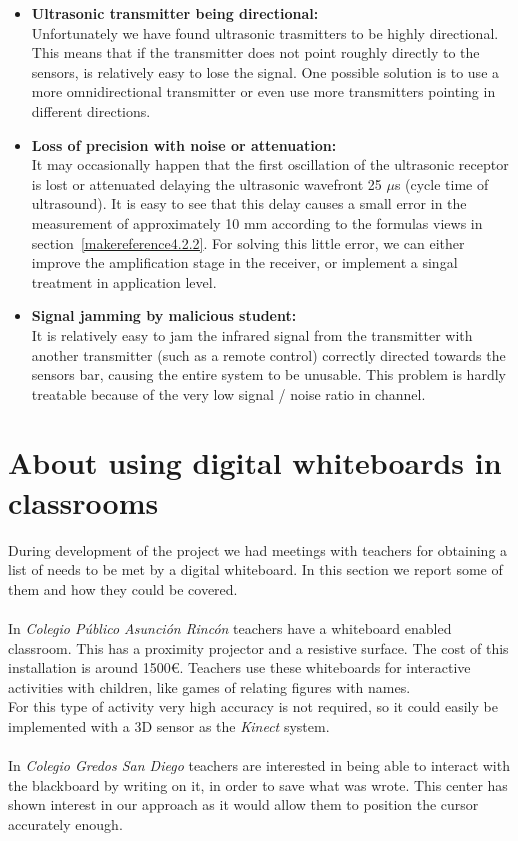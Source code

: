\begin{itemize}
\item \textbf{Ultrasonic transmitter being directional:}\\
Unfortunately we have found ultrasonic trasmitters to be 
highly directional. This means that if the transmitter does not point roughly 
directly to the sensors, is relatively easy to lose the signal. 
One possible solution is to use a more omnidirectional transmitter or even use 
more transmitters pointing in different directions.

\item \textbf{Loss of precision with noise or attenuation:}\\
It may occasionally happen that the first oscillation of the ultrasonic receptor is lost or attenuated delaying the ultrasonic wavefront 25 $\mu$s (cycle time of ultrasound). It is easy to see that this delay causes a small error in the measurement of approximately 10 mm according to the formulas views in section~\ref{makereference4.2.2}. For 
solving this little error, we can either improve the amplification stage in the receiver, or implement a singal treatment in application level.

\item \textbf{Signal jamming by malicious student:}\\
It is relatively easy to jam the infrared signal from the transmitter with another 
transmitter (such as a remote control) correctly directed towards the sensors bar, causing the entire system to be unusable. This problem is hardly treatable because of the very low signal / noise ratio in channel.

\end{itemize}

\section{About using digital whiteboards in classrooms}
\label{makereferenceE.3}

During development of the project we had meetings with teachers for obtaining a list of needs to be met by a digital whiteboard. In 
this section we report some of them and how they could be covered.\\
\\
In \textit{Colegio Público Asunción Rincón} teachers have a whiteboard enabled classroom. This has a proximity projector and a resistive surface. The cost of this installation is around 1500\euro. 
Teachers use these whiteboards for interactive activities with children, like games of relating figures with names.\\
For this type of activity very high accuracy is not required, so it could easily be implemented with a 
3D sensor as the \textit{Kinect} system.\\
\\
In \textit{Colegio Gredos San Diego} teachers are interested in being able to interact with the 
blackboard by writing on it, in order to save what was wrote. 
This center has shown interest in our approach as it would allow them to position the cursor accurately enough.